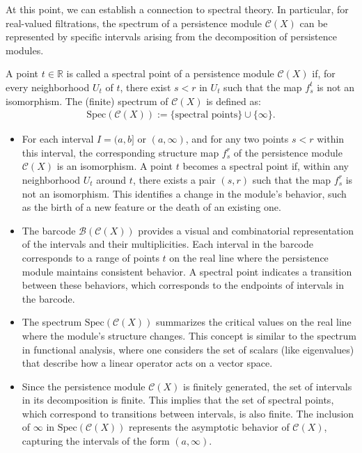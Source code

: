 At this point, we can establish a connection to spectral theory. In particular, for real-valued filtrations, the spectrum of a persistence module $\mathcal{C}(X)$ can be represented by specific intervals arising from the decomposition of persistence modules.

\begin{definition}[Spectrum]
A point $t \in \mathbb{R}$ is called a spectral point of a persistence module $\mathcal{C}(X)$ if, for every neighborhood $U_t$ of $t$, there exist $s < r$ in $U_t$ such that the map $f_{s}^t$ is not an isomorphism. The (finite) spectrum of $\mathcal{C}(X)$ is defined as:
\begin{align}
	\text{Spec}(\mathcal{C}(X)) := \{ \text{spectral points} \} \cup \{\infty\}.
\end{align}
\end{definition}

\newpage
\begin{remark}\noindent
\begin{itemize}
    \item For each interval $I = (a,b]$ or $(a,\infty)$, and for any two points $s < r$ within this interval, the corresponding structure map $f_{s}^r$ of the persistence module $\mathcal{C}(X)$ is an isomorphism. A point $t$ becomes a spectral point if, within any neighborhood $U_t$ around $t$, there exists a pair $(s, r)$ such that the map $f_{s}^r$ is not an isomorphism. This identifies a change in the module's behavior, such as the birth of a new feature or the death of an existing one.
    \item The barcode $\mathcal{B}(\mathcal{C}(X))$ provides a visual and combinatorial representation of the intervals and their multiplicities. Each interval in the barcode corresponds to a range of points $t$ on the real line where the persistence module maintains consistent behavior. A spectral point indicates a transition between these behaviors, which corresponds to the endpoints of intervals in the barcode.
    \item The spectrum $\text{Spec}(\mathcal{C}(X))$ summarizes the critical values on the real line where the module's structure changes. This concept is similar to the spectrum in functional analysis, where one considers the set of scalars (like eigenvalues) that describe how a linear operator acts on a vector space.
    \item Since the persistence module $\mathcal{C}(X)$ is finitely generated, the set of intervals in its decomposition is finite. This implies that the set of spectral points, which correspond to transitions between intervals, is also finite. The inclusion of $\infty$ in $\text{Spec}(\mathcal{C}(X))$ represents the asymptotic behavior of $\mathcal{C}(X)$, capturing the intervals of the form $(a, \infty)$.
\end{itemize}
\end{remark}


